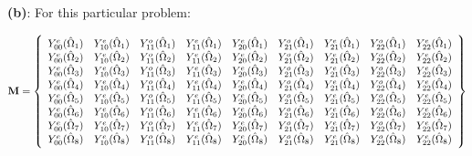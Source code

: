 \documentclass[10pt]{article}
\begin{document}
\textbf{(b)}: For this particular problem:

\begin{equation}
\textbf{M}=\left\{
\begin{array}{*{13}c}
Y_{00}^e(\hat{\Omega}_1)  & Y_{10}^e(\hat{\Omega}_1) & Y_{11}^o(\hat{\Omega}_1) & Y_{11}^e(\hat{\Omega}_1) & Y_{20}^e(\hat{\Omega}_1) & Y_{21}^o(\hat{\Omega}_1) & Y_{21}^e(\hat{\Omega}_1) & Y_{22}^o(\hat{\Omega}_1) & Y_{22}^e(\hat{\Omega}_1)\\
Y_{00}^e(\hat{\Omega}_2)  & Y_{10}^e(\hat{\Omega}_2) & Y_{11}^o(\hat{\Omega}_2) & Y_{11}^e(\hat{\Omega}_2) & Y_{20}^e(\hat{\Omega}_2) & Y_{21}^o(\hat{\Omega}_2) & Y_{21}^e(\hat{\Omega}_2) & Y_{22}^o(\hat{\Omega}_2) & Y_{22}^e(\hat{\Omega}_2)\\
Y_{00}^e(\hat{\Omega}_3)  & Y_{10}^e(\hat{\Omega}_3) & Y_{11}^o(\hat{\Omega}_3) & Y_{11}^e(\hat{\Omega}_3) & Y_{20}^e(\hat{\Omega}_3) & Y_{21}^o(\hat{\Omega}_3) & Y_{21}^e(\hat{\Omega}_3) & Y_{22}^o(\hat{\Omega}_3) & Y_{22}^e(\hat{\Omega}_3)\\
Y_{00}^e(\hat{\Omega}_4)  & Y_{10}^e(\hat{\Omega}_4) & Y_{11}^o(\hat{\Omega}_4) & Y_{11}^e(\hat{\Omega}_4) & Y_{20}^e(\hat{\Omega}_4) & Y_{21}^o(\hat{\Omega}_4) & Y_{21}^e(\hat{\Omega}_4) & Y_{22}^o(\hat{\Omega}_4) & Y_{22}^e(\hat{\Omega}_4)\\
Y_{00}^e(\hat{\Omega}_5)  & Y_{10}^e(\hat{\Omega}_5) & Y_{11}^o(\hat{\Omega}_5) & Y_{11}^e(\hat{\Omega}_5) & Y_{20}^e(\hat{\Omega}_5) & Y_{21}^o(\hat{\Omega}_5) & Y_{21}^e(\hat{\Omega}_5) & Y_{22}^o(\hat{\Omega}_5) & Y_{22}^e(\hat{\Omega}_5)\\
Y_{00}^e(\hat{\Omega}_6)  & Y_{10}^e(\hat{\Omega}_6) & Y_{11}^o(\hat{\Omega}_6) & Y_{11}^e(\hat{\Omega}_6) & Y_{20}^e(\hat{\Omega}_6) & Y_{21}^o(\hat{\Omega}_6) & Y_{21}^e(\hat{\Omega}_6) & Y_{22}^o(\hat{\Omega}_6) & Y_{22}^e(\hat{\Omega}_6)\\
Y_{00}^e(\hat{\Omega}_7)  & Y_{10}^e(\hat{\Omega}_7) & Y_{11}^o(\hat{\Omega}_7) & Y_{11}^e(\hat{\Omega}_7) & Y_{20}^e(\hat{\Omega}_7) & Y_{21}^o(\hat{\Omega}_7) & Y_{21}^e(\hat{\Omega}_7) & Y_{22}^o(\hat{\Omega}_7) & Y_{22}^e(\hat{\Omega}_7)\\
Y_{00}^e(\hat{\Omega}_8)  & Y_{10}^e(\hat{\Omega}_8) & Y_{11}^o(\hat{\Omega}_8) & Y_{11}^e(\hat{\Omega}_8) & Y_{20}^e(\hat{\Omega}_8) & Y_{21}^o(\hat{\Omega}_8) & Y_{21}^e(\hat{\Omega}_8) & Y_{22}^o(\hat{\Omega}_8) & Y_{22}^e(\hat{\Omega}_8)\\
\end{array}\right\}
\end{equation}
\end{document}

